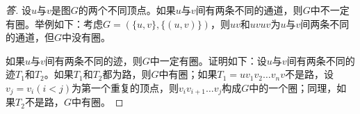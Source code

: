 \begin{proof}[答]
  设$u$与$v$是图$G$的两个不同顶点。如果$u$与$v$间有两条不同的通道，则$G$中不一定有圈。举例如下：考虑$G=(\{u,v\},\{(u,v)\})$，则$uv$和$uvuv$为$u$与$v$间两条不同的通道，但$G$中没有圈。

  如果$u$与$v$间有两条不同的迹，则$G$中一定有圈。证明如下：设$u$与$v$间有两条不同的迹$T_1$和$T_2$。如果$T_1$和$T_2$都为路，则$G$中有圈；如果$T_1=uv_1v_2\ldots v_nv$不是路，设$v_j=v_i(i<j)$为第一个重复的顶点，则$v_iv_{i+1}\ldots v_j$构成$G$中的一个圈；同理，如果$T_2$不是路，$G$中有圈。
  
\end{proof}